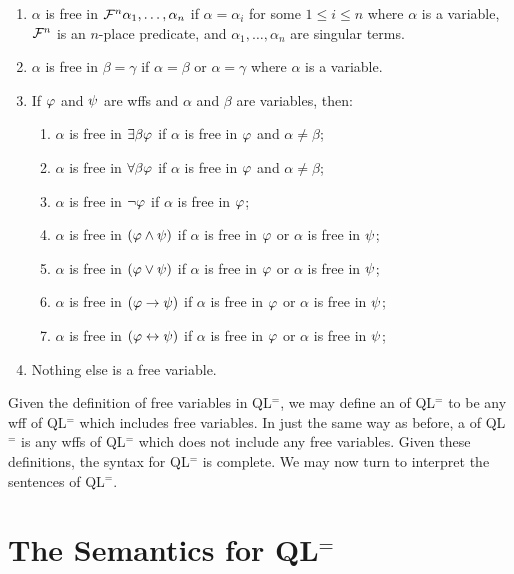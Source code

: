 \begin{enumerate}
  \item $\alpha$ is free in $\mathcal{F}^n\alpha_1,\ldots,\alpha_n$ if $\alpha=\alpha_i$ for some $1\leq i\leq n$ where $\alpha$ is a variable, $\mathcal{F}^n$ is an $n$-place predicate, and $\alpha_1,\ldots,\alpha_n$ are singular terms.
  \item $\alpha$ is free in $\beta=\gamma$ if $\alpha=\beta$ or $\alpha=\gamma$ where $\alpha$ is a variable.
  \item If $\varphi$ and $\psi$ are wffs and $\alpha$ and $\beta$ are variables, then:
    \begin{enumerate}
        \item $\alpha$ is free in $\exists \beta\varphi$ if $\alpha$ is free in $\varphi$ and $\alpha\neq\beta$;
        \item $\alpha$ is free in $\forall \beta\varphi$ if $\alpha$ is free in $\varphi$ and $\alpha\neq\beta$;
        \item $\alpha$ is free in $\neg\varphi$ if $\alpha$ is free in $\varphi$;
        \item $\alpha$ is free in $(\varphi\wedge\psi)$ if $\alpha$ is free in $\varphi$ or $\alpha$ is free in $\psi$;
        \item $\alpha$ is free in $(\varphi\vee\psi)$ if $\alpha$ is free in $\varphi$ or $\alpha$ is free in $\psi$;
        \item $\alpha$ is free in $(\varphi\rightarrow\psi)$ if $\alpha$ is free in $\varphi$ or $\alpha$ is free in $\psi$;
        \item $\alpha$ is free in $(\varphi\leftrightarrow\psi)$ if $\alpha$ is free in $\varphi$ or $\alpha$ is free in $\psi$;
    \end{enumerate}
  \item Nothing else is a free variable. 
\end{enumerate}

Given the definition of free variables in QL$^=$, we may define an  of QL$^=$ to be any wff of QL$^=$ which includes free variables.
In just the same way as before, a  of QL$^=$ is any wffs of QL$^=$ which does not include any free variables. 
Given these definitions, the syntax for QL$^=$ is complete.
We may now turn to interpret the sentences of QL$^=$. 




\section{The Semantics for QL$^=$}%
  \label{sec:SemanticsQL=}
  
